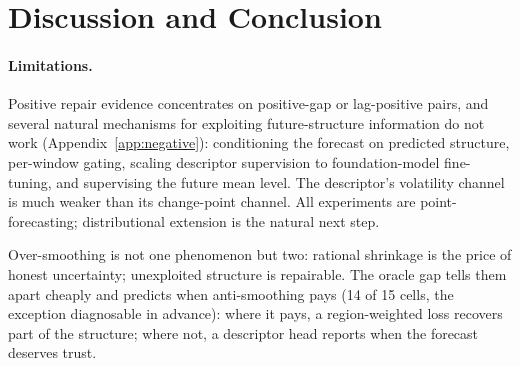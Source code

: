 \section{Discussion and Conclusion}
\label{sec:discussion}

\paragraph{Limitations.}
Positive repair evidence concentrates on positive-gap or lag-positive pairs, and several natural mechanisms for exploiting future-structure information do not work (Appendix~\ref{app:negative}): conditioning the forecast on predicted structure, per-window gating, scaling descriptor supervision to foundation-model fine-tuning, and supervising the future mean level. The descriptor's volatility channel is much weaker than its change-point channel. All experiments are point-forecasting; distributional extension is the natural next step.

Over-smoothing is not one phenomenon but two: rational shrinkage is the price of honest uncertainty; unexploited structure is repairable. The oracle gap tells them apart cheaply and predicts when anti-smoothing pays (14 of 15 cells, the exception diagnosable in advance): where it pays, a region-weighted loss recovers part of the structure; where not, a descriptor head reports when the forecast deserves trust.
